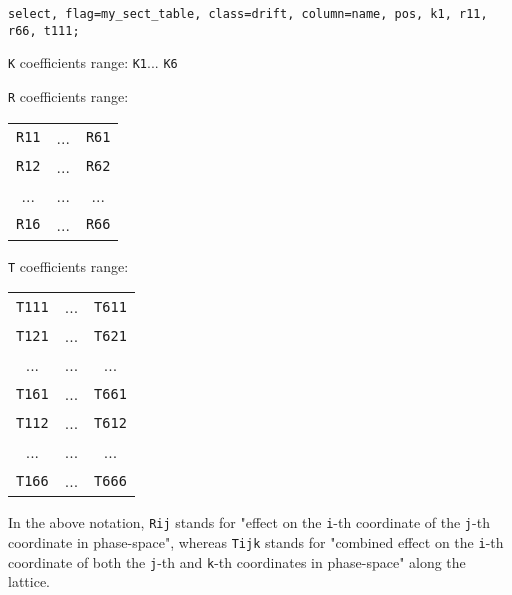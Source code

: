 \begin{verbatim}
select, flag=my_sect_table, class=drift, column=name, pos, k1, r11, r66, t111;
\end{verbatim}



\texttt{K} coefficients range: 
\texttt{K1}... 
\texttt{K6}


\texttt{R} coefficients range: 
\\
\begin{tabular}{ccc}
\texttt{R11} & ... & \texttt{R61} \\ 
\texttt{R12} & ... & \texttt{R62} \\ 
... & ... & ... \\ 
\texttt{R16} & ... & \texttt{R66}
\end{tabular}


\texttt{T} coefficients range: 
\\
\begin{tabular}{ccc}
\texttt{T111} & ... &\texttt{T611} \\ 
\texttt{T121} & ... & \texttt{T621} \\ 
... & ... & ... \\ 
\texttt{T161} & ... & \texttt{T661} \\ 
\texttt{T112} & ... & \texttt{T612} \\ 
... & ... & ... \\ 
\texttt{T166} & ... & \texttt{T666}
\end{tabular}

 In the above notation, 
\texttt{Rij} stands for "effect on the 
\texttt{i}-th coordinate of the 
\texttt{j}-th coordinate in phase-space", whereas 
\texttt{Tijk} stands for "combined effect on the 
\texttt{i}-th coordinate of both the 
\texttt{j}-th and 
\texttt{k}-th coordinates in phase-space" along the lattice. 

% 
% 
% 
% 
% 
% 
% 
   
